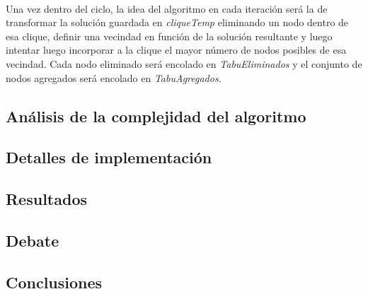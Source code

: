 \paragraph{}
Una vez dentro del ciclo, la idea del algoritmo en cada iteración será la de transformar la solución guardada en \textit{cliqueTemp} eliminando un nodo dentro de esa clique, definir una vecindad en función de la solución resultante y luego intentar luego incorporar a la clique el mayor número de nodos posibles de esa vecindad. Cada nodo eliminado será encolado en \textit{TabuEliminados} y el conjunto de nodos agregados será encolado en \textit{TabuAgregados}.




\subsection{Análisis de la complejidad del algoritmo}
\subsection{Detalles de implementación}
\subsection{Resultados}
\subsection{Debate}
\subsection{Conclusiones}
